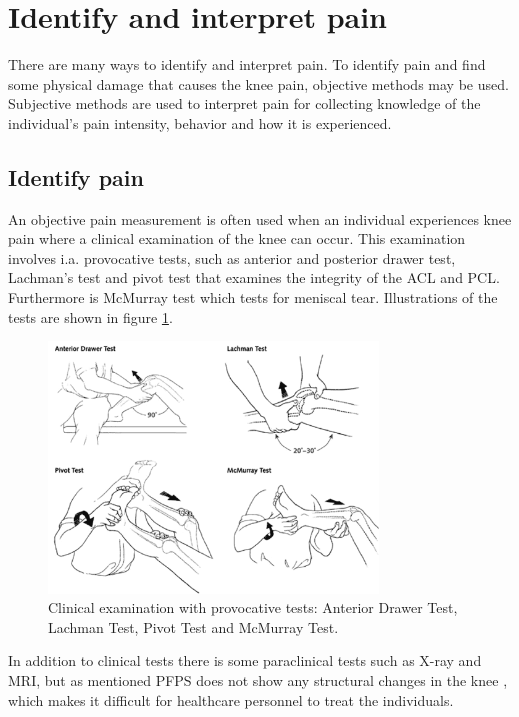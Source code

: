 \section{Identify and interpret pain}
There are many ways to identify and interpret pain. To identify pain and find some physical damage that causes the knee pain, objective methods may be used. Subjective methods are used to interpret pain for collecting knowledge of the individual's pain intensity, behavior and how it is experienced.\citep{Younger2009}

\subsection{Identify pain}
An objective pain measurement is often used when an individual experiences knee pain where a clinical examination of the knee can occur. This examination involves i.a. provocative tests, such as anterior and posterior drawer test, Lachman’s test and pivot test that examines the integrity of the ACL and PCL. Furthermore is McMurray test which tests for meniscal tear.\citep{Ghosh2010} Illustrations of the tests are shown in figure \ref{fig:kneetest}.

\begin{figure} [H]
\centering
\includegraphics[width=0.78\textwidth]{figures/kneetest}
\caption{Clinical examination with provocative tests: Anterior Drawer Test, Lachman Test, Pivot Test and McMurray Test.\citep{Ghosh2010}}
\label{fig:kneetest}
\end{figure}


\noindent
In addition to clinical tests there is some paraclinical tests such as X-ray and MRI, but as mentioned PFPS does not show any structural changes in the knee \citep{Petersen2013}, which makes it difficult for healthcare personnel to treat the individuals. 

